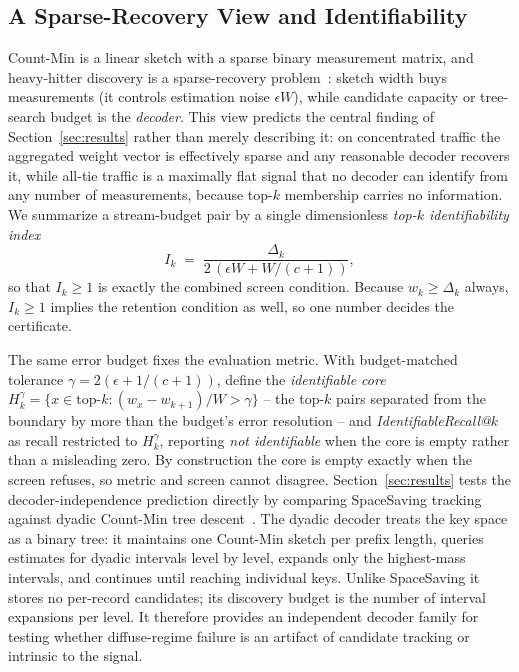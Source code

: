 \documentclass[conference]{IEEEtran}
\begin{document}
\subsection{A Sparse-Recovery View and Identifiability}
Count-Min is a linear sketch with a sparse binary measurement matrix, and heavy-hitter discovery is a sparse-recovery problem~\cite{gilbert2010sparse}: sketch width buys measurements (it controls estimation noise $\epsilon W$), while candidate capacity or tree-search budget is the \emph{decoder}. This view predicts the central finding of Section~\ref{sec:results} rather than merely describing it: on concentrated traffic the aggregated weight vector is effectively sparse and any reasonable decoder recovers it, while all-tie traffic is a maximally flat signal that no decoder can identify from any number of measurements, because top-$k$ membership carries no information. We summarize a stream-budget pair by a single dimensionless \emph{top-$k$ identifiability index}
\begin{equation}
I_k \;=\; \frac{\Delta_k}{2\,(\epsilon W + W/(c+1))},
\end{equation}
so that $I_k \geq 1$ is exactly the combined screen condition. Because $w_k \geq \Delta_k$ always, $I_k\geq 1$ implies the retention condition as well, so one number decides the certificate.

The same error budget fixes the evaluation metric. With budget-matched tolerance $\gamma=2(\epsilon+1/(c{+}1))$, define the \emph{identifiable core} $H_k^\gamma=\{x\in\text{top-}k : (w_x-w_{k+1})/W>\gamma\}$ -- the top-$k$ pairs separated from the boundary by more than the budget's error resolution -- and \emph{IdentifiableRecall@}$k$ as recall restricted to $H_k^\gamma$, reporting \emph{not identifiable} when the core is empty rather than a misleading zero. By construction the core is empty exactly when the screen refuses, so metric and screen cannot disagree. Section~\ref{sec:results} tests the decoder-independence prediction directly by comparing SpaceSaving tracking against dyadic Count-Min tree descent~\cite{cormode2005countmin}. The dyadic decoder treats the key space as a binary tree: it maintains one Count-Min sketch per prefix length, queries estimates for dyadic intervals level by level, expands only the highest-mass intervals, and continues until reaching individual keys. Unlike SpaceSaving it stores no per-record candidates; its discovery budget is the number of interval expansions per level. It therefore provides an independent decoder family for testing whether diffuse-regime failure is an artifact of candidate tracking or intrinsic to the signal.
\end{document}
